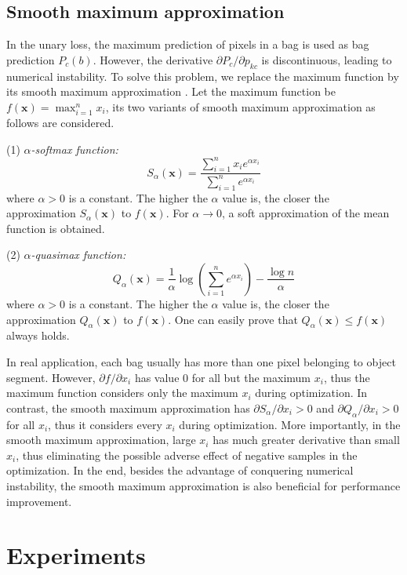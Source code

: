 \documentclass[runningheads]{llncs}
\def\x{{\mathbf x}}
\begin{document}
\subsection{Smooth maximum approximation}


In the unary loss, the maximum prediction of pixels in a bag is used as bag prediction $P_c(b)$. However, the derivative $\partial P_c / \partial p_{kc}$ is discontinuous, leading to numerical instability. To solve this problem, we replace the maximum function by its smooth maximum approximation \cite{lange2014applications}. Let the maximum function be $f(\x) = \max_{i=1}^n x_i$, its two variants of smooth maximum approximation as follows are considered. 

(1) \textit{$\alpha$-softmax function:}
\begin{equation}
S_{\alpha}(\x) = \frac{\sum_{i=1}^n x_i e^{\alpha x_i}}{\sum_{i=1}^n e^{\alpha x_i}}
\end{equation}
where $\alpha>0$ is a constant. The higher the $\alpha$ value is, the closer the approximation $S_{\alpha}(\x)$ to $f(\x)$. For $\alpha \rightarrow 0$, a soft approximation of the mean function is obtained.

(2) \textit{$\alpha$-quasimax function:}
\begin{equation}
Q_{\alpha}(\x) = \frac{1}{\alpha} \log \left(\sum_{i=1}^n e^{\alpha x_i}\right) - \frac{\log n}{\alpha}
\end{equation}
where $\alpha>0$ is a constant. The higher the $\alpha$ value is, the closer the approximation $Q_{\alpha}(\x)$ to $f(\x)$. One can easily prove that $Q_{\alpha}(\x) \leq f(\x)$ always holds.

In real application, each bag usually has more than one pixel belonging to object segment. However, $\partial f / \partial x_i$ has value 0 for all but the maximum $x_i$, thus the maximum function considers only the maximum $x_i$ during optimization. In contrast, the smooth maximum approximation has $\partial S_{\alpha} / \partial x_i > 0$ and $\partial Q_{\alpha} / \partial x_i > 0$ for all $x_i$, thus it considers every $x_i$ during optimization. More importantly, in the smooth maximum approximation, large $x_i$ has much greater derivative than small $x_i$, thus eliminating the possible adverse effect of negative samples in the optimization. In the end, besides the advantage of conquering numerical instability, the smooth maximum approximation is also beneficial for performance improvement.

\section{Experiments}
\end{document}
